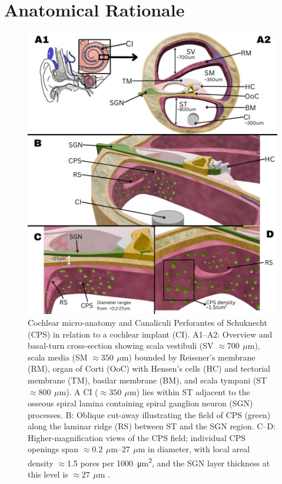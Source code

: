 \documentclass[referee,pdflatex, sn-vancouver-num]{sn-jnl}%
\theoremstyle{thmstyleone}%
\theoremstyle{thmstyletwo}%
\theoremstyle{thmstylethree}%
\newcommand{\um}{\ensuremath{\,\mu\mathrm{m}}}
\DeclareRobustCommand{\textendash}{\ifmmode\text{-}\else\leavevmode\hbox{--}\fi}
\begin{document}
\section{Anatomical Rationale}\label{sec3}
\begin{figure}[ht]
	\centering
	\includegraphics[width=0.89 \textwidth]{JNER_Submission/manuscript/figures/3DAnatomyPanel.jpg}
	\caption{Cochlear micro-anatomy and Canaliculi Perforantes of Schuknecht (CPS) in relation to a cochlear implant (CI). A1\textendash A2: Overview and basal-turn cross-section showing scala vestibuli (SV $\approx \SI{700}{\um}$), scala media (SM $\approx \SI{350}{\um}$) bounded by Reissner’s membrane (RM), organ of Corti (OoC) with Hensen’s cells (HC) and tectorial membrane (TM), basilar membrane (BM), and scala tympani (ST $\approx \SI{800}{\um}$). A CI ($\approx \SI{350}{\um}$) lies within ST adjacent to the osseous spiral lamina containing spiral ganglion neuron (SGN) processes. B: Oblique cut-away illustrating the field of CPS (green) along the laminar ridge (RS) between ST and the SGN region. C–D: Higher-magnification views of the CPS field; individual CPS openings span $\approx\SIrange{0.2}{27}{\um}$ in diameter, with local areal density $\approx$1.5 pores per \SI{1000}{\micro\meter\squared}, and the SGN layer thickness at this level is $\approx \SI{27}{\um}$ \cite{Schuknecht1959,schuknecht1963,lim1970,masuda1971,tanaka1973,shepherd2004}.}
	\label{fig:cochlea_overview}
\end{figure}
\end{document}
